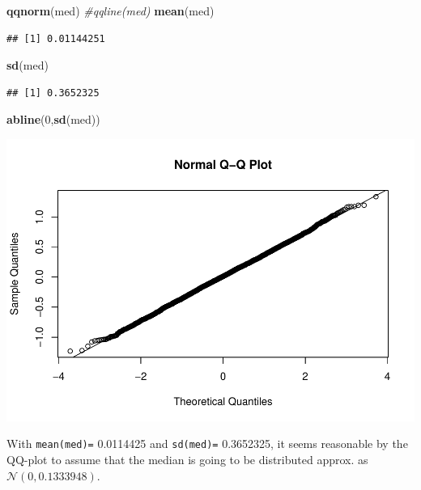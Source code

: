 \documentclass[
]{article}
\newenvironment{Shaded}{\begin{snugshade}}{\end{snugshade}}
\newcommand{\CommentTok}[1]{\textcolor[rgb]{0.56,0.35,0.01}{\textit{#1}}}
\newcommand{\DecValTok}[1]{\textcolor[rgb]{0.00,0.00,0.81}{#1}}
\newcommand{\KeywordTok}[1]{\textcolor[rgb]{0.13,0.29,0.53}{\textbf{#1}}}
\newcommand{\NormalTok}[1]{#1}
\begin{document}
\begin{Shaded}
\begin{Highlighting}[]
\KeywordTok{qqnorm}\NormalTok{(med)}
\CommentTok{#qqline(med)}
\KeywordTok{mean}\NormalTok{(med)}
\end{Highlighting}
\end{Shaded}

\begin{verbatim}
## [1] 0.01144251
\end{verbatim}

\begin{Shaded}
\begin{Highlighting}[]
\KeywordTok{sd}\NormalTok{(med)}
\end{Highlighting}
\end{Shaded}

\begin{verbatim}
## [1] 0.3652325
\end{verbatim}

\begin{Shaded}
\begin{Highlighting}[]
\KeywordTok{abline}\NormalTok{(}\DecValTok{0}\NormalTok{,}\KeywordTok{sd}\NormalTok{(med))}
\end{Highlighting}
\end{Shaded}

\begin{center}\includegraphics{matstatproblems20-21_files/figure-latex/unnamed-chunk-32-1} \end{center}

With \texttt{mean(med)=} 0.0114425 and \texttt{sd(med)=} 0.3652325, it
seems reasonable by the QQ-plot to assume that the median is going to be
distributed approx. as \(\mathcal{N}(0,0.1333948).\)
\end{document}

